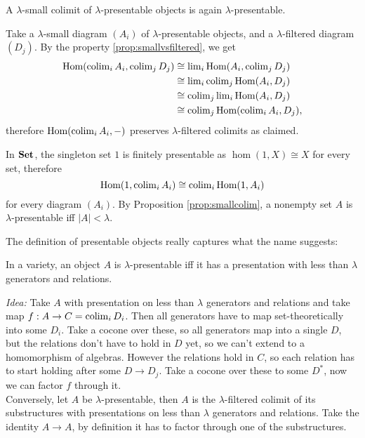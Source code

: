 \begin{Proposition}\label{prop:smallcolim} A $\lambda$-small colimit of $\lambda$-presentable objects is again $\lambda$-presentable.
\end{Proposition}
\begin{Proof}
Take a $\lambda$-small diagram $(A_i)$ of $\lambda$-presentable objects, and a $\lambda$-filtered diagram $(D_j)$. By the property \ref{prop:smallvsfiltered}, we get
\begin{align*}
\textrm{Hom}(\operatorname{colim}_i A_i, \operatorname{colim}_j D_j) &\cong \operatorname{lim}_i \textrm{Hom}(A_i, \operatorname{colim}_j D_j) \\
&\cong \operatorname{lim}_i \operatorname{colim}_j \textrm{Hom}(A_i, D_j) \\
&\cong \operatorname{colim}_j \operatorname{lim}_i \textrm{Hom}(A_i, D_j) \\
&\cong \operatorname{colim}_j \textrm{Hom}(\operatorname{colim}_i A_i, D_j),
\end{align*}
therefore $\textrm{Hom}(\operatorname{colim}_i A_i, -)$ preserves $\lambda$-filtered colimits as claimed.
\end{Proof}

\begin{Example}
In $\mathbf{Set}$, the singleton set $1$ is finitely presentable as $\hom(1,X) \cong X$ for every set, therefore
\[ \textrm{Hom}(1,\operatorname{colim}_i A_i) \cong \operatorname{colim}_i \textrm{Hom}(1,A_i) \]
for every diagram $(A_i)$. By Proposition \ref{prop:smallcolim}, a nonempty set $A$ is $\lambda$-presentable iff $|A| < \lambda$.
\end{Example}

The definition of presentable objects really captures what the name suggests: 

\begin{Proposition}In a variety, an object $A$ is $\lambda$-presentable iff it has a presentation with less than $\lambda$ generators and relations.
\end{Proposition}
\textit{Idea: } Take $A$ with presentation on less than $\lambda$ generators and relations and take map $f : A \to C = \operatorname{colim}_i D_i$. Then all generators have to map set-theoretically into some $D_i$. Take a cocone over these, so all generators map into a single $D$, but the relations don't have to hold in $D$ yet, so we can't extend to a homomorphism of algebras. However the relations hold in $C$, so each relation has to start holding after some $D \to D_j$. Take a cocone over these to some $D^*$, now we can factor $f$ through it. \\

Conversely, let $A$ be $\lambda$-presentable, then $A$ is the $\lambda$-filtered colimit of its substructures with presentations on less than $\lambda$ generators and relations. Take the identity $A \to A$, by definition it has to factor through one of the substructures.

